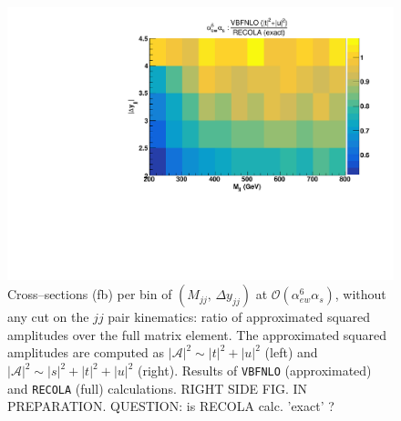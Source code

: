 \begin{figure}[hbt]
\centering
\includegraphics[scale=0.395]{figures/scanfigures/a6as_vbfnloVSrecola_tu.pdf}
\caption{Cross--sections (fb) per bin of $(M_{jj},\,\Delta y_{jj})$ at $\mathcal{O}(\alpha_{ew}^6\alpha_s)$, without any cut on the $jj$ pair kinematics: ratio of approximated squared amplitudes over the full matrix element. The approximated squared amplitudes are computed as $|\mathcal{A}|^2 \sim |t|^2 + |u|^2$ (left) and $|\mathcal{A}|^2 \sim |s|^2 + |t|^2 + |u|^2$ (right). Results of \texttt{VBFNLO} (approximated) and \texttt{RECOLA} (full) calculations. RIGHT SIDE FIG. IN PREPARATION. QUESTION: is RECOLA calc. 'exact' ?}\label{fig:ratio2d_NLO}
\end{figure}